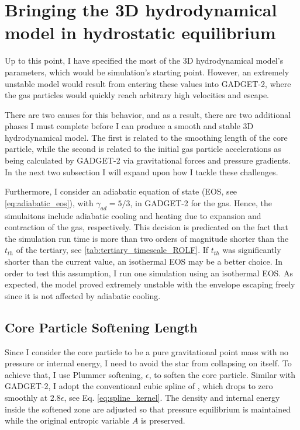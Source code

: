 \section{Bringing the 3D hydrodynamical model in hydrostatic equilibrium}

Up to this point, I have specified the most of the 3D hydrodynamical model's parameters, which would be simulation's starting point. However, an extremely unstable model would result from entering these values into GADGET-2, where the gas particles would quickly reach arbitrary high velocities and escape.

There are two causes for this behavior, and as a result, there are two additional phases I must complete before I can produce a smooth and stable 3D hydrodynamical model. The first is related to the smoothing length of the core particle, while the second is related to the initial gas particle accelerations as being calculated by GADGET-2 via gravitational forces and pressure gradients. In the next two subsection I will expand upon how I tackle these challenges. 

Furthermore, I consider an adiabatic equation of state (EOS, see \cref{eq:adiabatic_eos}), with $\gamma_{ad} = 5/3$, in GADGET-2 for the gas. Hence, the simulaitons include adiabatic cooling and heating due to expansion and contraction of the gas, respectively. This decision is predicated on the fact that the simulation run time is more than two orders of magnitude shorter than the $t_{th}$ of the tertiary, see \cref{tab:tertiary_timescale_ROLF}. If $t_{th}$ was significantly shorter than the current value, an isothermal EOS may be a better choice. In order to test this assumption, I run one simulation using an isothermal EOS. As expected, the model proved extremely unstable with the envelope escaping freely since it is not affected by adiabatic cooling.

\subsection{Core Particle Softening Length}

Since I consider the core particle to be a pure gravitational point mass with no pressure or internal energy, I need to avoid the star from collapsing on itself.
To achieve that, I use Plummer softening, $\epsilon$, to soften the core particle. Similar with GADGET-2, I adopt the conventional cubic spline of \cite{monaghan1985refined}, which drops to zero smoothly at $2.8 \epsilon$, see Eq. \eqref{eq:spline_kernel}. The density and internal energy inside the softened zone are adjusted so that pressure equilibrium is maintained while the original entropic variable $A$ is preserved. 

